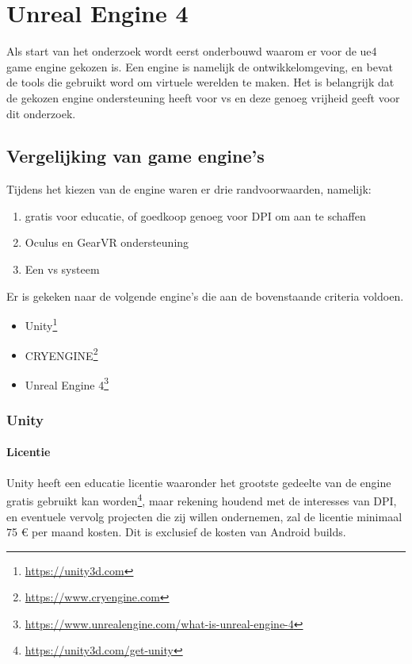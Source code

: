 \chapter{Unreal Engine 4}

Als start van het onderzoek wordt eerst onderbouwd waarom er voor de \gls{ue4} game engine gekozen is. Een engine is namelijk de ontwikkelomgeving, en bevat de tools die gebruikt word om virtuele werelden te maken. Het is belangrijk dat de gekozen engine ondersteuning heeft voor \gls{vs} en deze genoeg vrijheid geeft voor dit onderzoek.


\section{Vergelijking van game engine's}

Tijdens het kiezen van de engine waren er drie randvoorwaarden, namelijk: 
\begin{enumerate}
	\item gratis voor educatie, of goedkoop genoeg voor DPI om aan te schaffen
	\item Oculus en GearVR ondersteuning
	\item Een \gls{vs} systeem
\end{enumerate}

Er is gekeken naar de volgende engine's die aan de bovenstaande criteria voldoen.
\begin{itemize}
\item Unity\footnote{\url{https://unity3d.com}}
\item CRYENGINE\footnote{\url{https://www.cryengine.com}}
\item Unreal Engine 4\footnote{\url{https://www.unrealengine.com/what-is-unreal-engine-4}}
\end{itemize}

\subsection{Unity}

\subsubsection{Licentie}
Unity heeft een educatie licentie waaronder het grootste gedeelte van de engine gratis gebruikt kan worden\footnote{\url{https://unity3d.com/get-unity}}, maar rekening houdend met de interesses van DPI, en eventuele vervolg projecten die zij willen ondernemen, zal de licentie minimaal 75 € per maand kosten. Dit is exclusief de kosten van Android builds.

